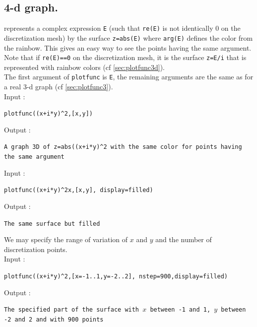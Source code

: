 \documentclass[a4paper,11pt]{book}
\begin{document}
\subsection{4-d graph.}\label{sec:plotfunc4}
 represents a complex expression {\tt E} 
(such that {\tt re(E)} is not identically 0 on the discretization mesh)
by the surface {\tt z=abs(E)} where {\tt arg(E)} defines the color 
from the rainbow. This gives an easy way to 
see the points having the same argument.
Note that if {\tt re(E)==0} on the discretization mesh, 
it is the surface {\tt z=E/i} that is represented with rainbow colors 
(cf \ref{sec:plotfunc3d}).\\
The first argument of {\tt plotfunc} is {\tt E}, 
the remaining arguments are the same 
as for a real 3-d graph (cf \ref{sec:plotfunc3}).\\
Input :
\begin{center}{\tt plotfunc((x+i*y)\verb|^|2,[x,y])}\end{center}
Output :
\begin{center}{\tt A graph 3D of z=abs((x+i*y)\verb|^|2 with the same color for
points having the same argument}\end{center}
Input :
\begin{center}{\tt plotfunc((x+i*y)\verb|^|2x,[x,y], display=filled)}\end{center}
Output :
\begin{center}{\tt The same surface but filled}\end{center}
We may specify the range of variation of $x$ and $y$ and the number of 
discretization points.\\
Input :
\begin{center}{\tt plotfunc((x+i*y)\verb|^|2,[x=-1..1,y=-2..2], nstep=900,display=filled)}\end{center}
Output :
\begin{center}{\tt The specified part of the surface with $x$ between -1 and 1, $y$ between -2 and 2 and with 900 points}\end{center}
 
\end{document}
